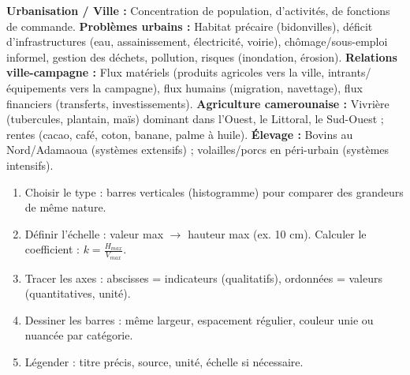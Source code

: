 \documentclass[11pt]{article}
\newcommand{\cle}[1]{{\popxbold\color{popdark}#1}}
\newcounter{popsec}
\newcounter{popsub}
\newcommand{\courssub}[1]{%
  \stepcounter{popsub}%
  \par\vspace{9pt}\noindent{\popxbold\fontsize{11.5}{13}\selectfont\color{popink}{\color{poporange}\thepopsec.\thepopsub}\hspace{6pt}#1}\par\nopagebreak\vspace{4pt}
}
\begin{document}
\courssub{Ressources à mobiliser}

\begin{definition}
\textbf{\cle{Urbanisation} / \cle{Ville} :} Concentration de population, d'activités, de fonctions de commande. \textbf{\cle{Problèmes urbains} :} \cle{Habitat précaire} (bidonvilles), déficit d'infrastructures (eau, assainissement, électricité, voirie), chômage/sous-emploi informel, gestion des déchets, pollution, risques (inondation, érosion). \textbf{\cle{Relations ville-campagne} :} Flux matériels (produits agricoles vers la ville, intrants/équipements vers la campagne), flux humains (migration, navettage), flux financiers (transferts, investissements). \textbf{\cle{Agriculture} camerounaise :} Vivrière (tubercules, plantain, maïs) dominant dans l'Ouest, le Littoral, le Sud-Ouest ; rentes (cacao, café, coton, banane, palme à huile). \textbf{\cle{Élevage} :} Bovins au Nord/Adamaoua (systèmes extensifs) ; volailles/porcs en péri-urbain (systèmes intensifs).
\end{definition}

\begin{methode}
\begin{enumerate}
    \item Choisir le type : barres verticales (histogramme) pour comparer des grandeurs de même nature.
    \item Définir l'échelle : valeur max $\rightarrow$ hauteur max (ex. 10 cm). Calculer le coefficient : $k = \frac{H_{max}}{V_{max}}$.
    \item Tracer les axes : abscisses = indicateurs (qualitatifs), ordonnées = valeurs (quantitatives, unité).
    \item Dessiner les barres : même largeur, espacement régulier, couleur unie ou nuancée par catégorie.
    \item Légender : titre précis, source, unité, échelle si nécessaire.
\end{enumerate}
\end{methode}
\end{document}

